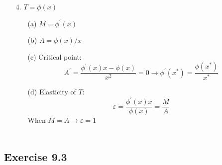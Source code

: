 \documentclass{./../../Latex/homework}
\begin{document}
\begin{enumerate}
\newpage

\item[4.] $T=\phi(x)$
\begin{enumerate}
  \item[(a)] $M=\phi^{\prime}(x)$
  \item[(b)] $A=\phi(x)/x$
  \item[(c)] Critical point:
  $$A^{\prime}=\frac{\phi^{\prime}(x) x-\phi(x)}{x^{2}}=0 \rightarrow \phi^{\prime}(x^*)=\frac{\phi(x^*)}{x^*}$$
  \item[(d)] Elasticity of $T$: $$\varepsilon=\frac{\phi^{\prime}(x) x}{\phi(x)}=\frac{M}{A}$$
  When $M=A \rightarrow \varepsilon=1$ \\~\\
\end{enumerate}
\end{enumerate}

\subsection*{Exercise 9.3} 
\end{document}
